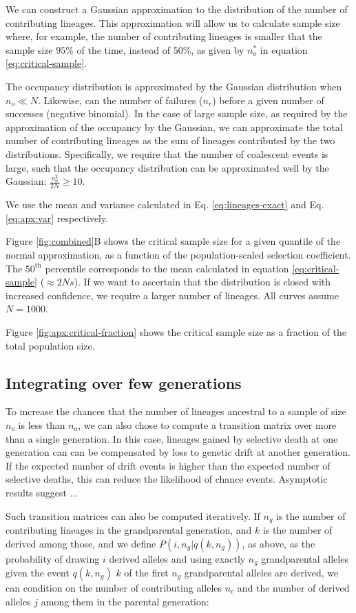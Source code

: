 \documentclass[review]{elsarticle}
\begin{document}
We can construct a Gaussian approximation to the distribution of the number of contributing lineages.
This approximation will allow us to calculate sample size where, for example, the number of
contributing lineages is smaller that the sample size $95\%$ of the time, instead of $50\%$, as
given by $n_o^*$ in equation \eqref{eq:critical-sample}.

The occupancy distribution is approximated by the Gaussian distribution \citep{ONeill2019} when
$n_o \ll N$. Likewise, can the number of failures ($n_r$) before a given number of successes
(negative binomial). In the case of large sample size, as required by the approximation of the
occupancy by the Gaussian, we can approximate the total number of contributing lineages as the sum
of lineages contributed by the two distributions. Specifically, we require that the number of
coalescent events is large, such that the occupancy distribution can be approximated well by the
Gaussian: $\frac{n_o^2}{2N} \ge 10$.

We use the mean and variance calculated in Eq. \ref{eq:lineages-exact} and Eq. \ref{eq:apx:var} respectively. 

Figure \ref{fig:combined}B shows the critical sample size for a given quantile of the normal
approximation, as a function of the population-scaled selection coefficient. The $50^{\text{th}}$
percentile corresponds to the mean calculated in equation \ref{eq:critical-sample} ($\approx 2Ns$).
If we want to ascertain that the distribution is closed with increased confidence, we require a
larger number of lineages. All curves assume $N=1000$.

Figure \ref{fig:apx:critical-fraction} shows the critical sample size as a fraction of the total
population size.

\subsection
{Integrating over few generations} 
To increase the chances that the number of lineages ancestral to a sample 
of size $n_o$ is less than $n_o$, we can also chose to compute a transition matrix over more 
than a single generation. In this case, lineages gained by selective death at one generation can 
can be compensated by loss to genetic drift at another generation. If the expected number of 
drift events is higher than the expected number of selective deaths, this can reduce the likelihood 
of chance events. Asymptotic results suggest ... 

Such transition matrices can also be computed iteratively. If $n_g$ is the number of contributing
lineages in the grandparental generation, and $k$ is the number of derived among those, and we
define $P(i, n_g | q(k, n_g))$, as above, as the probability of drawing $i$ derived alleles and
using exactly $n_g$ grandparental alleles given the event $q(k, n_g)$ $k$ of the first $n_g$
grandparental alleles are derived, we can condition on the number of contributing alleles $n_c$ and
the number of derived alleles $j$ among them in the parental generation:
 
\end{document}
